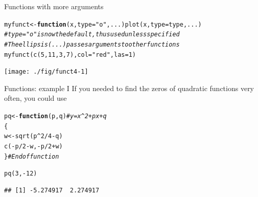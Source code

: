 \documentclass[xcolor=table,           xcolor=dvipsnames]{beamer}\usepackage[]{graphicx}\usepackage[]{color}
\makeatletter
\newcommand{\hlnum}[1]{\textcolor[rgb]{0,0,0}{#1}}
\newcommand{\hlstr}[1]{\textcolor[rgb]{0.545,0.137,0.137}{#1}}
\newcommand{\hlcom}[1]{\textcolor[rgb]{0,0.392,0}{\textit{#1}}}
\newcommand{\hlopt}[1]{\textcolor[rgb]{0,0,0}{#1}}
\newcommand{\hlstd}[1]{\textcolor[rgb]{0,0,0}{#1}}
\newcommand{\hlkwa}[1]{\textcolor[rgb]{1,0,0}{\textbf{#1}}}
\newcommand{\hlkwb}[1]{\textcolor[rgb]{0,0,0}{#1}}
\newcommand{\hlkwc}[1]{\textcolor[rgb]{1,0,1}{#1}}
\newcommand{\hlkwd}[1]{\textcolor[rgb]{0,0,1}{#1}}
\newenvironment{kframe}{%
 \def\at@end@of@kframe{}%
 \ifinner\ifhmode%
  \def\at@end@of@kframe{\end{minipage}}%
  \begin{minipage}{\columnwidth}%
 \fi\fi%
 \def\FrameCommand##1{\hskip\@totalleftmargin \hskip-\fboxsep
 \colorbox{shadecolor}{##1}\hskip-\fboxsep
     \hskip-\linewidth \hskip-\@totalleftmargin \hskip\columnwidth}%
 \MakeFramed {\advance\hsize-\width
   \@totalleftmargin\z@ \linewidth\hsize
   \@setminipage}}%
 {\par\unskip\endMakeFramed%
 \at@end@of@kframe}
\newenvironment{knitrout}{}{} %
\makeatother
\begin{document}

\begin{frame}[fragile]{Functions with more arguments}
\begin{knitrout}\small
{}\color{fgcolor}\begin{kframe}
\begin{alltt}
\hlstd{myfunct} \hlkwb{<-} \hlkwa{function}\hlstd{(}\hlkwc{x}\hlstd{,} \hlkwc{type}\hlstd{=}\hlstr{"o"}\hlstd{,} \hlkwc{...}\hlstd{)} \hlkwd{plot}\hlstd{(x,} \hlkwc{type}\hlstd{=type, ...)}
\hlcom{# type="o" is now the default, thus used unless specified}
\hlcom{# The ellipsis (...) passes arguments to other functions}
\hlkwd{myfunct}\hlstd{(}  \hlkwd{c}\hlstd{(}\hlnum{5}\hlstd{,}\hlnum{11}\hlstd{,}\hlnum{3}\hlstd{,}\hlnum{7}\hlstd{) ,} \hlkwc{col}\hlstd{=}\hlstr{"red"}\hlstd{,} \hlkwc{las}\hlstd{=}\hlnum{1}\hlstd{)}
\end{alltt}
\end{kframe}

{\centering \texttt{[image: ./fig/funct4-1]} 

}



\end{knitrout}
\vspace{-2em}
\end{frame}


\begin{frame}[fragile]{Functions: example I}
If you needed to find the zeros of quadratic functions very often, you could use
\begin{knitrout}
\color{fgcolor}\begin{kframe}
\begin{alltt}
\hlstd{pq} \hlkwb{<-} \hlkwa{function}\hlstd{(}\hlkwc{p}\hlstd{,}\hlkwc{q}\hlstd{)} \hlcom{# y = x^2 + px + q}
              \hlstd{\{}
              \hlstd{w} \hlkwb{<-} \hlkwd{sqrt}\hlstd{( p}\hlopt{^}\hlnum{2} \hlopt{/} \hlnum{4} \hlopt{-} \hlstd{q )}
              \hlkwd{c}\hlstd{(}\hlopt{-}\hlstd{p}\hlopt{/}\hlnum{2}\hlopt{-}\hlstd{w,} \hlopt{-}\hlstd{p}\hlopt{/}\hlnum{2}\hlopt{+}\hlstd{w)}
              \hlstd{\}} \hlcom{# End of function}

\hlkwd{pq}\hlstd{(}\hlnum{3}\hlstd{,} \hlopt{-}\hlnum{12}\hlstd{)}
\end{alltt}
\begin{verbatim}
## [1] -5.274917  2.274917
\end{verbatim}
\end{kframe}
\end{knitrout}
\end{frame}
\end{document}
